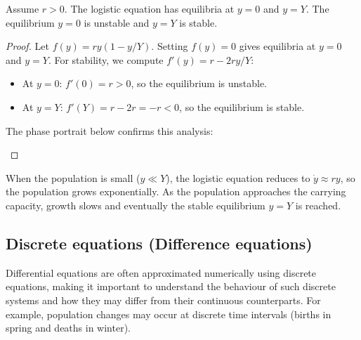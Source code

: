 \documentclass[a4paper]{article}
\begin{document}
\begin{prop}
  Assume $r > 0$. The logistic equation has equilibria at $y = 0$ and $y = Y$. The equilibrium $y = 0$ is unstable and $y = Y$ is stable.
\end{prop}
\begin{proof}
  Let $f(y) = ry(1 - y/Y)$. Setting $f(y) = 0$ gives equilibria at $y = 0$ and $y = Y$. For stability, we compute $f'(y) = r - 2ry/Y$:
  \begin{itemize}
    \item At $y = 0$: $f'(0) = r > 0$, so the equilibrium is unstable.
    \item At $y = Y$: $f'(Y) = r - 2r = -r < 0$, so the equilibrium is stable.
  \end{itemize}
  The phase portrait below confirms this analysis:
  \begin{center}
  \end{center}
\end{proof}

\begin{remark}
  When the population is small ($y \ll Y$), the logistic equation reduces to $\dot{y} \approx ry$, so the population grows exponentially. As the population approaches the carrying capacity, growth slows and eventually the stable equilibrium $y = Y$ is reached.
\end{remark}

\subsection{Discrete equations (Difference equations)}
\begin{remark}[Motivation]
  Differential equations are often approximated numerically using discrete equations, making it important to understand the behaviour of such discrete systems and how they may differ from their continuous counterparts. For example, population changes may occur at discrete time intervals (births in spring and deaths in winter).
\end{remark}
\end{document}
